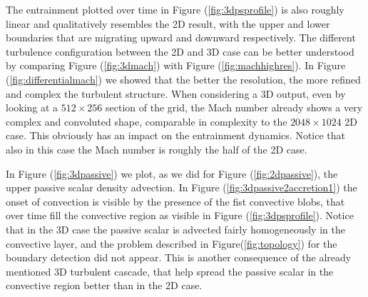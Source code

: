The entrainment plotted over time in Figure (\ref{fig:3dpsprofile}) is also roughly linear and qualitatively resembles the 2D result, with the upper and lower boundaries that are migrating upward and downward respectively.
The different turbulence configuration between the 2D and 3D case can be better understood by comparing Figure (\ref{fig:3dmach}) with Figure (\ref{fig:machhighres}). In Figure (\ref{fig:differentialmach}) we showed that the better the resolution, the more refined and complex the turbulent structure. When considering a 3D output, even by looking at a $512 \times 256$ section of the grid, the Mach number already shows a very complex and convoluted shape, comparable in complexity to the $2048 \times 1024$ 2D case. This obviously has an impact on the entrainment dynamics. Notice that also in this case the Mach number is roughly the half of the 2D case. 


In Figure (\ref{fig:3dpassive}) we plot, as we did for Figure (\ref{fig:2dpassive}), the upper passive scalar density advection. In Figure (\ref{fig:3dpassive2accretion1}) the onset of convection is visible by the presence of the fist convective blobs, that over time fill the convective region as visible in Figure (\ref{fig:3dpsprofile}). Notice that in the 3D case the passive scalar is advected fairly homogeneously in the convective layer, and the problem described in Figure(\ref{fig:topology}) for the boundary detection did not appear. This is another consequence of the already mentioned 3D turbulent cascade, that help spread the passive scalar in the convective region better than in the 2D case.

